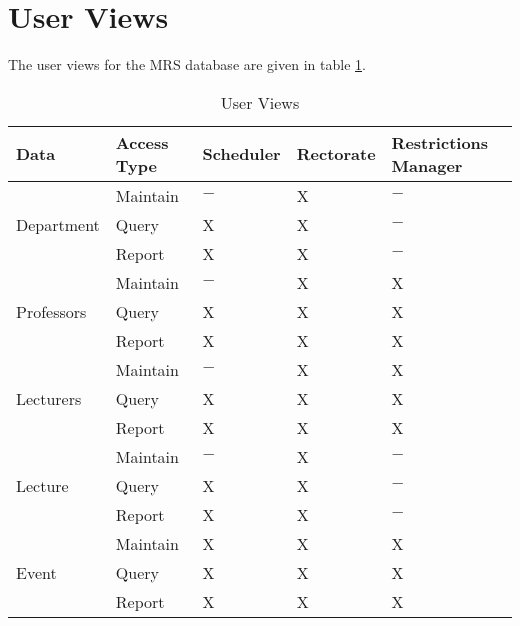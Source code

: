 \clearpage

\section{User Views}
The user views for the MRS database are given in table \ref{tab:userviews}.

\begin{table}[h]
	\centering
	\begin{tabularx}{\textwidth}{XXXXX}
		Data & Access Type & Scheduler & Rectorate & Restrictions Manager\\
		\toprule
				& Maintain	& $-$ & X & $-$ \\
		Department	& Query		& X & X & $-$ \\
				& Report	& X & X & $-$ \\
		\midrule
				& Maintain	& $-$ & X & X \\
		Professors	& Query		& X & X & X \\
				& Report	& X & X & X \\
		\midrule
				& Maintain	& $-$ & X & X \\
		Lecturers	& Query		& X & X & X \\
				& Report	& X & X & X \\
		\midrule
				& Maintain	& $-$ & X & $-$ \\
		Lecture		& Query		& X & X & $-$ \\
				& Report	& X & X & $-$ \\
		\midrule
				& Maintain	& X & X & X \\
		Event		& Query		& X & X & X \\
				& Report	& X & X & X \\
	\end{tabularx}
	\caption{User Views}
	\label{tab:userviews}
\end{table}
